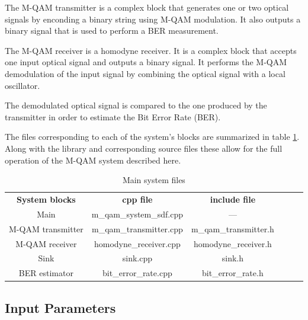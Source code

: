 The M-QAM transmitter is a complex block that generates one or two optical signals by enconding a binary string using M-QAM modulation. It also outputs a binary signal that is used to perform a BER measurement.

The M-QAM receiver is a homodyne receiver. It is a complex block that accepts one input optical signal and outputs
a binary signal. It performs the M-QAM demodulation of the input signal by combining the optical signal with a local oscillator.

The demodulated optical signal is compared to the one produced by the transmitter in order to estimate the Bit Error Rate (BER).

The files corresponding to each of the system's blocks are summarized in table \ref{files_table}. Along with the library and corresponding source files these allow for the full operation of the M-QAM system described here.

\begin{table}[]
	\centering
	\label{files_table}
	\caption{Main system files}
	\begin{tabular}{|c|c|c|ccc}
		\cline{1-3}
		\textbf{System blocks} & \textbf{cpp file} & \textbf{include file}  &  \\ \cline{1-3}
		Main & m\_qam\_system\_sdf.cpp & --- &  \\ \cline{1-3}
		M-QAM transmitter & m\_qam\_transmitter.cpp & m\_qam\_transmitter.h &  \\ \cline{1-3}
		M-QAM receiver & homodyne\_receiver.cpp & homodyne\_receiver.h &   \\ \cline{1-3}
		Sink & sink.cpp & sink.h &   \\ \cline{1-3}
		BER estimator & bit\_error\_rate.cpp & bit\_error\_rate.h &  \\ \cline{1-3}
	\end{tabular}
\end{table}

\subsection{Input Parameters}

